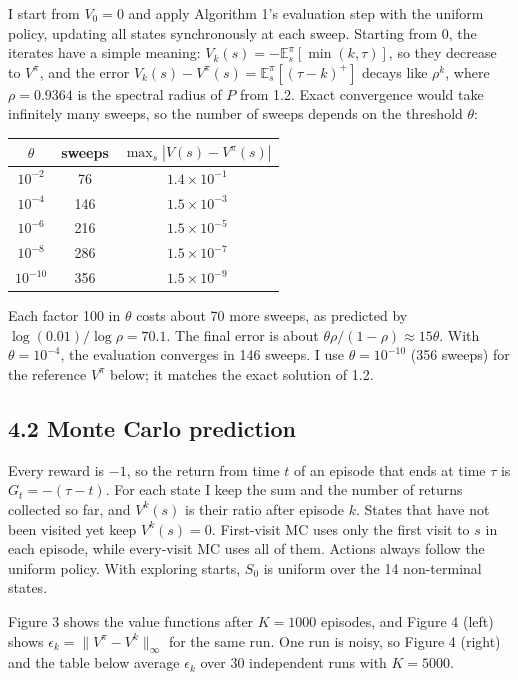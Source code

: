 \documentclass[letterpaper, 11pt]{article}
\newcommand{\E}{\mathbb{E}}     %
\newcommand{\1}{\mathds{1}}	%
\theoremstyle{definition}
\begin{document}
I start from $V_0 = 0$ and apply Algorithm 1's evaluation step with the uniform policy, updating all states synchronously at each sweep. Starting from $0$, the iterates have a simple meaning: $V_k(s) = -\E^\pi_s[\min(k, \tau)]$, so they decrease to $V^\pi$, and the error $V_k(s) - V^\pi(s) = \E^\pi_s[(\tau - k)^+]$ decays like $\rho^k$, where $\rho = 0.9364$ is the spectral radius of $P$ from 1.2. Exact convergence would take infinitely many sweeps, so the number of sweeps depends on the threshold $\theta$:
\begin{center}
\begin{tabular}{ccc}
\toprule
$\theta$ & sweeps & $\max_s |V(s) - V^\pi(s)|$ \\
\midrule
$10^{-2}$  & 76  & $1.4 \times 10^{-1}$ \\
$10^{-4}$  & 146 & $1.5 \times 10^{-3}$ \\
$10^{-6}$  & 216 & $1.5 \times 10^{-5}$ \\
$10^{-8}$  & 286 & $1.5 \times 10^{-7}$ \\
$10^{-10}$ & 356 & $1.5 \times 10^{-9}$ \\
\bottomrule
\end{tabular}
\end{center}
Each factor 100 in $\theta$ costs about 70 more sweeps, as predicted by $\log(0.01)/\log\rho = 70.1$. The final error is about $\theta \rho/(1 - \rho) \approx 15\theta$. With $\theta = 10^{-4}$, the evaluation converges in 146 sweeps. I use $\theta = 10^{-10}$ (356 sweeps) for the reference $V^\pi$ below; it matches the exact solution of 1.2.

\subsection*{4.2 Monte Carlo prediction}

Every reward is $-1$, so the return from time $t$ of an episode that ends at time $\tau$ is $G_t = -(\tau - t)$. For each state I keep the sum and the number of returns collected so far, and $V^k(s)$ is their ratio after episode $k$. States that have not been visited yet keep $V^k(s) = 0$. First-visit MC uses only the first visit to $s$ in each episode, while every-visit MC uses all of them. Actions always follow the uniform policy. With exploring starts, $S_0$ is uniform over the 14 non-terminal states.

Figure 3 shows the value functions after $K = 1000$ episodes, and Figure 4 (left) shows $\epsilon_k = \|V^\pi - V^k\|_\infty$ for the same run. One run is noisy, so Figure 4 (right) and the table below average $\epsilon_k$ over 30 independent runs with $K = 5000$.
\end{document}
